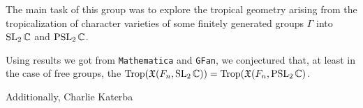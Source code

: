 \begin{frame}
  The main task of this group was to explore the tropical geometry arising
  from the tropicalization of character varieties of some finitely
  generated groups $\Gamma$ into $\operatorname{SL}_2\mathbb{C}$ and $\operatorname{PSL}_2\mathbb{C}$.%

  \pause%

  Using results we got from \texttt{Mathematica} and \texttt{GFan}, we
  conjectured that, at least in the case of free groups, the
  $\operatorname{Trop}(\mathfrak{X}(F_n,\operatorname{SL}_2\mathbb{C}))=\operatorname{Trop}(\mathfrak{X}(F_n,\operatorname{PSL}_2\mathbb{C})$.%

  Additionally, Charlie Katerba
\end{frame}

